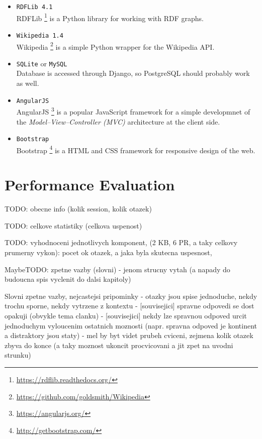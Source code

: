 \documentclass[12pt, twoside]{fithesis2}		%
\renewcommand{\_}{\leavevmode \kern0.07em\vbox{\hrule width0.4em}}
\newcommand{\squarebullet}{\textcolor{black}{\raisebox{0.15em}{\rule{4pt}{4pt}}}}
\newcommand{\emptysquarebullet}{\textcolor{black}{\raisebox{0.10em}{\tiny$\square$}}}
\newenvironment{myItemize}{
  \begin{itemize}[leftmargin=2em,rightmargin=1em,itemsep=\parskip ,parsep=0em,topsep=0em,partopsep=0em]
  \renewcommand{\labelitemi}{\squarebullet}
  \renewcommand{\labelitemii}{\textbullet}
}{
  \end{itemize}
}
\begin{document}
\begin{myItemize}
\item \texttt{RDFLib 4.1}\\
RDFLib%
\footnote{\url{https://rdflib.readthedocs.org/}}
is a Python library for working with RDF graphs.

\item \texttt{Wikipedia 1.4}\\
Wikipedia%
\footnote{\url{https://github.com/goldsmith/Wikipedia}}
is a simple Python wrapper for the Wikipedia API.

\item \texttt{SQLite} or \texttt{MySQL}\\
Database is accessed through Django,
so PostgreSQL should probably work as well.

\item \texttt{AngularJS}\\
AngularJS%
\footnote{\url{https://angularjs.org/}}
is a popular JavaScript framework for a simple developmnet of the \emph{Model--View--Controller (MVC)} architecture at the client side.

\item \texttt{Bootstrap}\\
Bootstrap%
\footnote{\url{http://getbootstrap.com/}}
is a HTML and CSS framework for responsive design of the web.
\end{myItemize}





\section{Performance Evaluation}
\label{sec:performance-evaluation}

TODO: obecne info (kolik session, kolik otazek)

TODO: celkove statistiky (celkova uspenost)

TODO: vyhodnoceni jednotlivych komponent, (2 KB, 6 PR, a taky celkovy prumerny vykon): pocet ok otazek, a jaka byla skutecna uspesnost,

MaybeTODO: zpetne vazby (slovni) - jenom strucny vytah (a napady do budoucna spis vyclenit do dalsi kapitoly)


Slovni zpetne vazby, nejcastejsi pripominky
- otazky jsou spise jednoduche, nekdy trochu sporne, nekdy vytrzene z kontextu
- [souvisejici] spravne odpovedi se dost opakuji (obvykle tema clanku)
- [souvisejici] nekdy lze spravnou odpoved urcit jednoduchym vyloucenim ostatnich moznosti (napr. spravna odpoved je kontinent a distraktory jsou staty)
- mel by byt videt prubeh cviceni, zejmena kolik otazek zbyva do konce (a taky moznost ukoncit procvicovani a jit zpet na uvodni strunku)
\end{document}
